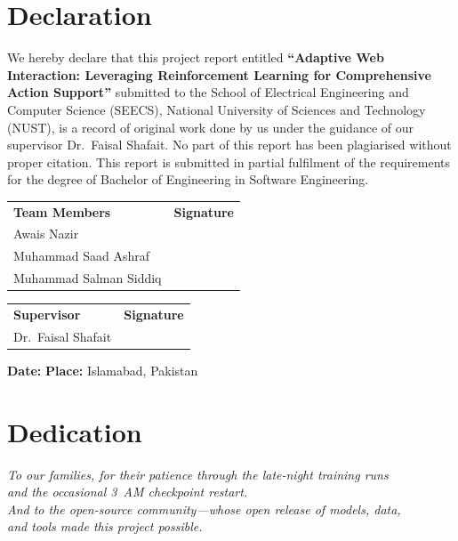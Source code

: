 \documentclass[12pt,a4paper]{report}
\begin{document}
\chapter*{Declaration}

We hereby declare that this project report entitled \textbf{``Adaptive Web Interaction: Leveraging Reinforcement Learning for Comprehensive Action Support''} submitted to the School of Electrical Engineering and Computer Science (SEECS), National University of Sciences and Technology (NUST), is a record of original work done by us under the guidance of our supervisor Dr.~Faisal Shafait. No part of this report has been plagiarised without proper citation. This report is submitted in partial fulfilment of the requirements for the degree of Bachelor of Engineering in Software Engineering.

\vspace{1.2cm}
\noindent
\begin{tabular}{@{}p{}p{}@{}}
\textbf{Team Members} & \textbf{Signature} \\[0.5cm]
Awais Nazir & \hrulefill \\[0.7cm]
Muhammad Saad Ashraf & \hrulefill \\[0.7cm]
Muhammad Salman Siddiq & \hrulefill \\[0.7cm]
\end{tabular}

\vspace{0.8cm}
\noindent
\begin{tabular}{@{}p{}p{}@{}}
\textbf{Supervisor} & \textbf{Signature} \\[0.5cm]
Dr.~Faisal Shafait & \hrulefill \\[0.7cm]
\end{tabular}

\vspace{0.6cm}
\noindent\textbf{Date:} \underline{\hspace{4cm}} \hspace{1cm} \textbf{Place:} Islamabad, Pakistan

\chapter*{Dedication}
\vspace*{2cm}
\begin{center}
\textit{To our families, for their patience through the late-night training runs\\and the occasional 3~AM checkpoint restart.\\[0.6cm]
And to the open-source community---whose open release of models, data,\\and tools made this project possible.}
\end{center}
\end{document}
